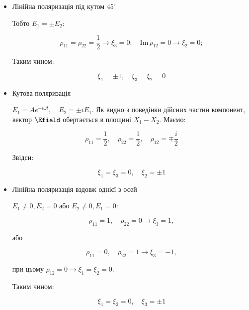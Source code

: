 \begin{itemize}

\item Лінійна поляризація під кутом $45^{\circ}$

Тобто \(E_1 = \pm E_2\):

\begin{equation*}
\rho_{11} = \rho_{22} = \frac{1}{2} \rightarrow \xi_3 = 0; \quad \text{Im} \, \rho_{12} = 0 \rightarrow \xi_2 = 0;
\end{equation*}

Таким чином:

\begin{equation*}
\xi_1 = \pm 1, \quad \xi_3 = \xi_2 = 0
\end{equation*}



\item  Кутова поляризація

\(E_1 = A e^{-i\omega t}, \quad E_2 = \pm i E_1\). Як видно з поведінки дійсних частин компонент, вектор \(\Efield\) обертається в площині \(X_1 -
X_2\). Маємо:

\begin{equation*}
\rho_{11} = \frac{1}{2}, \quad \rho_{22} = \frac{1}{2}, \quad \rho_{12} = \mp \frac{i}{2}
\end{equation*}

Звідси:

\begin{equation*}
\xi_1 = \xi_3 = 0, \quad \xi_2 = \pm 1
\end{equation*}

\item Лінійна поляризація вздовж однієї з осей

\(E_1 \neq 0, E_2 = 0\) або \(E_2 \neq 0, E_1 = 0\):

\begin{equation*}
\rho_{11} = 1, \quad \rho_{22} = 0 \rightarrow \xi_3 = 1,
\end{equation*}

або

\begin{equation*}
\rho_{11} = 0, \quad \rho_{22} = 1 \rightarrow \xi_3 = -1,
\end{equation*}

при цьому \(\rho_{12} = 0 \rightarrow \xi_1 = \xi_2 = 0\).

Таким чином:

\begin{equation*}
\xi_1 = \xi_2 = 0, \quad \xi_3 = \pm 1
\end{equation*}

\end{itemize}

